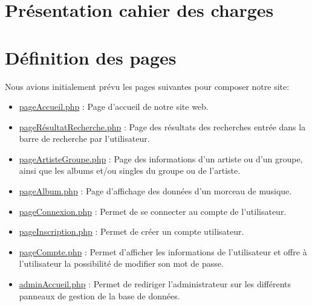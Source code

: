 
    \newpage

\section{Présentation cahier des charges}

\newpage

\section{Définition des pages}

	    	\begin{paragraphe}
	    	    Nous avions initialement prévu les pages suivantes pour composer notre site:\\
        		\begin{itemize}
        			\item \underline{pageAccueil.php} : Page d'accueil de notre site web.
        			\item \underline{pageRésultatRecherche.php} : Page des résultats des recherches entrée dans la barre de recherche par l'utilisateur.
        			\item \underline{pageArtisteGroupe.php} : Page des informations d'un artiste ou d'un groupe, ainsi que les albums et/ou singles du groupe ou de l'artiste.
        			\item \underline{pageAlbum.php} : Page d'affichage des données d'un morceau de musique.
        		\end{itemize}
                \vspace{1em}
                \begin{itemize}
        			\item \underline{pageConnexion.php} : Permet de se connecter au compte de l'utilisateur.
        			\item \underline{pageInscription.php} : Permet de créer un compte utilisateur.
        			\item \underline{pageCompte.php} : Permet d'afficher les informations de l'utilisateur et offre à l'utilisateur la possibilité de modifier son mot de passe.
        		\end{itemize}
                \vspace{1em}
        		\begin{itemize}
        			\item \underline{adminAccueil.php} : Permet de rediriger l'administrateur sur les différents panneaux de gestion de la base de données.

\end{itemize}
\end{paragraphe}
